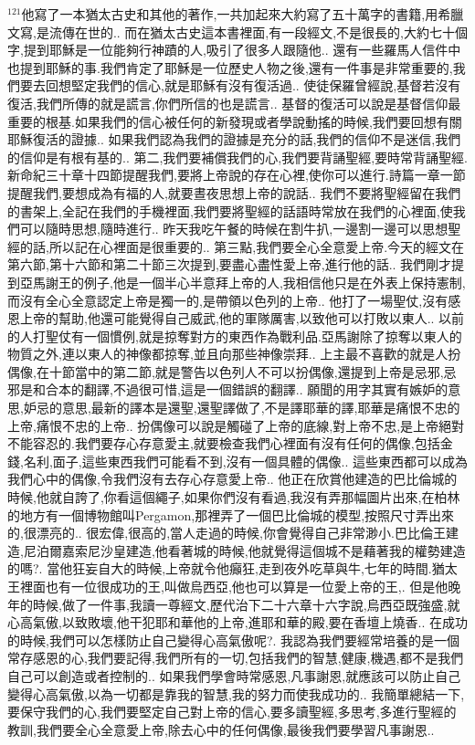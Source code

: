\documentclass{book}
\begin{document}
$^{121}$他寫了一本猶太古史和其他的著作,一共加起來大約寫了五十萬字的書籍,用希臘文寫,是流傳在世的..
而在猶太古史這本書裡面,有一段經文,不是很長的,大約七十個字,提到耶穌是一位能夠行神蹟的人,吸引了很多人跟隨他..
還有一些羅馬人信件中也提到耶穌的事.我們肯定了耶穌是一位歷史人物之後,還有一件事是非常重要的,我們要去回想堅定我們的信心,就是耶穌有沒有復活過..
使徒保羅曾經說,基督若沒有復活,我們所傳的就是謊言,你們所信的也是謊言..
基督的復活可以說是基督信仰最重要的根基.如果我們的信心被任何的新發現或者學說動搖的時候,我們要回想有關耶穌復活的證據..
如果我們認為我們的證據是充分的話,我們的信仰不是迷信,我們的信仰是有根有基的..
第二,我們要補償我們的心,我們要背誦聖經,要時常背誦聖經.新命紀三十章十四節提醒我們,要將上帝說的存在心裡,使你可以進行.詩篇一章一節提醒我們,要想成為有福的人,就要晝夜思想上帝的說話..
我們不要將聖經留在我們的書架上,全記在我們的手機裡面,我們要將聖經的話語時常放在我們的心裡面,使我們可以隨時思想,隨時進行..
昨天我吃午餐的時候在割牛扒,一邊割一邊可以思想聖經的話,所以記在心裡面是很重要的..
第三點,我們要全心全意愛上帝.今天的經文在第六節,第十六節和第二十節三次提到,要盡心盡性愛上帝,進行他的話..
我們剛才提到亞馬謝王的例子,他是一個半心半意拜上帝的人,我相信他只是在外表上保持憲制,而沒有全心全意認定上帝是獨一的,是帶領以色列的上帝..
他打了一場聖仗,沒有感恩上帝的幫助,他還可能覺得自己威武,他的軍隊厲害,以致他可以打敗以東人..
以前的人打聖仗有一個慣例,就是掠奪對方的東西作為戰利品.亞馬謝除了掠奪以東人的物質之外,連以東人的神像都掠奪,並且向那些神像崇拜..
上主最不喜歡的就是人扮偶像,在十節當中的第二節,就是警告以色列人不可以扮偶像,還提到上帝是忌邪,忌邪是和合本的翻譯,不過很可惜,這是一個錯誤的翻譯..
願聞的用字其實有嫉妒的意思,妒忌的意思,最新的譯本是還聖,還聖譯做了,不是譯耶華的譯,耶華是痛恨不忠的上帝,痛恨不忠的上帝..
扮偶像可以說是觸碰了上帝的底線,對上帝不忠,是上帝絕對不能容忍的.我們要存心存意愛主,就要檢查我們心裡面有沒有任何的偶像,包括金錢,名利,面子,這些東西我們可能看不到,沒有一個具體的偶像..
這些東西都可以成為我們心中的偶像,令我們沒有去存心存意愛上帝..
他正在欣賞他建造的巴比倫城的時候,他就自誇了,你看這個繩子,如果你們沒有看過,我沒有弄那幅圖片出來,在柏林的地方有一個博物館叫Pergamon,那裡弄了一個巴比倫城的模型,按照尺寸弄出來的,很漂亮的..
很宏偉,很高的,當人走過的時候,你會覺得自己非常渺小.巴比倫王建造,尼泊爾嘉索尼沙皇建造,他看著城的時候,他就覺得這個城不是藉著我的權勢建造的嗎?.
當他狂妄自大的時候,上帝就令他癲狂,走到夜外吃草與牛,七年的時間.猶太王裡面也有一位很成功的王,叫做烏西亞,他也可以算是一位愛上帝的王,.
但是他晚年的時候,做了一件事,我讀一尊經文,歷代治下二十六章十六字說,烏西亞既強盛,就心高氣傲,以致敗壞,他干犯耶和華他的上帝,進耶和華的殿,要在香壇上燒香..
在成功的時候,我們可以怎樣防止自己變得心高氣傲呢?.
我認為我們要經常培養的是一個常存感恩的心,我們要記得,我們所有的一切,包括我們的智慧,健康,機遇,都不是我們自己可以創造或者控制的..
如果我們學會時常感恩,凡事謝恩,就應該可以防止自己變得心高氣傲,以為一切都是靠我的智慧,我的努力而使我成功的..
我簡單總結一下,要保守我們的心,我們要堅定自己對上帝的信心,要多讀聖經,多思考,多進行聖經的教訓,我們要全心全意愛上帝,除去心中的任何偶像,最後我們要學習凡事謝恩..
\newpage
\end{document}
